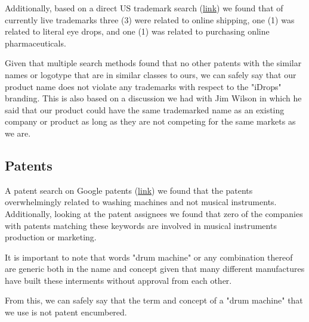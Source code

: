 \documentclass[11pt]{article}
\begin{document}
Additionally, based on a direct US trademark search (\href{http://tmsearch.uspto.gov/bin/showfield?f=toc\&state=4808\%3Ai92r0g.1.1\&p\_search=searchss\&p\_L=50\&BackReference=\&p\_plural=yes\&p\_s\_PARA1=\&p\_tagrepl\%7E\%3A=PARA1\%24LD\&expr=PARA1+AND+PARA2\&p\_s\_PARA2=idrops\&p\_tagrepl\%7E\%3A=PARA2\%24COMB\&p\_op\_ALL=AND\&a\_default=search\&a\_search=Submit+Query\&a\_search=Submit+Query}{link}) we found that
of currently live trademarks three (3) were related to online shipping, one (1)
was related to literal eye drops, and one (1) was related to purchasing online
pharmaceuticals.

Given that multiple search methods found that no other patents with
the similar names or logotype that are in similar classes to ours, we
can safely say that our product name does not violate any trademarks
with respect to the "iDrops" branding. This is also based on a discussion
we had with Jim Wilson in which he said that our product could have the
same trademarked name as an existing company or product as long as they
are not competing for the same markets as we are.

\subsection{Patents}
\label{sec:orgdce8a6d}
A patent search on Google patents (\href{https://patents.google.com/?q=\%22drum+machine\%22,\%22drum-machine\%22,\%22drummachine\%22}{link}) we found that the patents overwhelmingly 
related to washing machines and not musical instruments. Additionally, looking
at the patent assignees we found that zero of the companies with patents matching
these keywords are involved in musical instruments production or marketing.

It is important to note that words "drum machine" or any combination
thereof are generic both in the name and concept given that many
different manufactures have built these interments without approval
from each other.

From this, we can safely say that the term and concept of a "drum machine" that
we use is not patent encumbered. 
\end{document}
